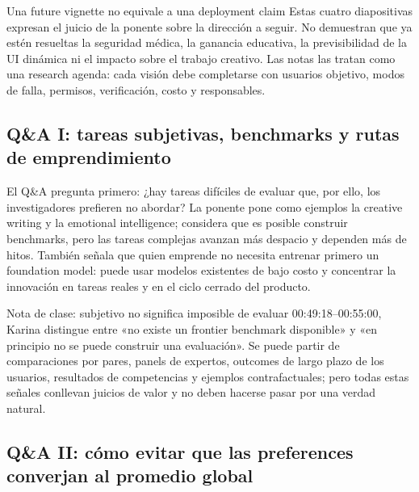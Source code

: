 \begin{warningbox}{Una future vignette no equivale a una deployment claim}
Estas cuatro diapositivas expresan el juicio de la ponente sobre la dirección a seguir. No demuestran que ya estén resueltas la seguridad médica, la ganancia educativa, la previsibilidad de la UI dinámica ni el impacto sobre el trabajo creativo. Las notas las tratan como una research agenda: cada visión debe completarse con usuarios objetivo, modos de falla, permisos, verificación, costo y responsables.
\end{warningbox}


\subsection{Q\&A I: tareas subjetivas, benchmarks y rutas de emprendimiento}

El Q\&A pregunta primero: ¿hay tareas difíciles de evaluar que, por ello, los investigadores prefieren no abordar? La ponente pone como ejemplos la creative writing y la emotional intelligence; considera que es posible construir benchmarks, pero las tareas complejas avanzan más despacio y dependen más de hitos. También señala que quien emprende no necesita entrenar primero un foundation model: puede usar modelos existentes de bajo costo y concentrar la innovación en tareas reales y en el ciclo cerrado del producto.

\begin{knowledgebox}{Nota de clase: subjetivo no significa imposible de evaluar}
00:49:18--00:55:00, Karina distingue entre «no existe un frontier benchmark disponible» y «en principio no se puede construir una evaluación». Se puede partir de comparaciones por pares, panels de expertos, outcomes de largo plazo de los usuarios, resultados de competencias y ejemplos contrafactuales; pero todas estas señales conllevan juicios de valor y no deben hacerse pasar por una verdad natural.
\end{knowledgebox}

\subsection{Q\&A II: cómo evitar que las preferences converjan al promedio global}

